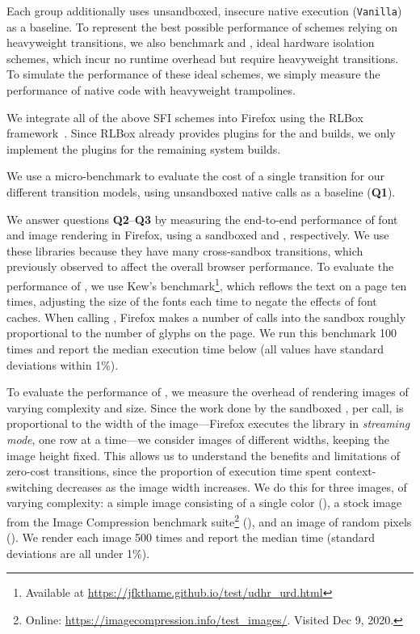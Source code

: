 Each group additionally uses unsandboxed, insecure native execution (\texttt{Vanilla}) as a baseline.
%
To represent the best possible performance of schemes relying on heavyweight
transitions, we also benchmark \tridealheavy and \tridealheavysixfour,
ideal hardware isolation schemes, which incur no runtime
overhead but require heavyweight transitions.
%
To simulate the performance of these ideal schemes, we simply measure the performance
of native code with heavyweight trampolines.

We integrate all of the above SFI schemes into Firefox using the RLBox
framework~\cite{rlbox}.
%
Since RLBox already provides plugins for the \trlucet and \trnacl builds, we
only implement the plugins for the remaining system builds.

%
We use a micro-benchmark to evaluate the cost of a single transition for our
different transition models, using unsandboxed native calls as a baseline
(\textbf{Q1}).

We answer questions \textbf{Q2}--\textbf{Q3} by measuring the end-to-end
performance of font and image rendering in Firefox, using a sandboxed
\libgraphite and \libjpeg, respectively.
%
We use these libraries because they have many cross-sandbox transitions, which
\citet{rlbox} previously observed to affect the overall browser performance.
%
To evaluate the performance of \libgraphite, we use Kew's
benchmark\footnote{Available at
\url{https://jfkthame.github.io/test/udhr_urd.html}}, which reflows the text on
a page ten times, adjusting the size of the fonts each time to negate the
effects of font caches.
%
When calling \libgraphite, Firefox makes a number of calls into the sandbox
roughly proportional to the number of glyphs on the page.
%
We run this benchmark 100 times and report the median execution
time below (all values have standard deviations within 1\%).

To evaluate the performance of \libjpeg, we measure the overhead of rendering
images of varying complexity and size.
%
Since the work done by the sandboxed \libjpeg, per call, is proportional to the
width of the image\dash---Firefox executes the library in \emph{streaming
mode}, one row at a time\dash---we consider images of different widths,
keeping the image height fixed.
%
This allows us to understand the benefits and limitations of zero-cost
transitions, since the proportion of execution time spent context-switching decreases
as the image width increases.
%
We do this for three images, of varying complexity: a simple image consisting
of a single color (\simplejpeg), a stock image from the Image Compression
benchmark suite\footnote{Online:
\url{https://imagecompression.info/test_images/}.  Visited Dec 9, 2020.}
(\stockjpeg), and an image of random pixels (\randomjpeg).
%
We render each image 500 times and report the median time (standard
deviations are all under 1\%).

